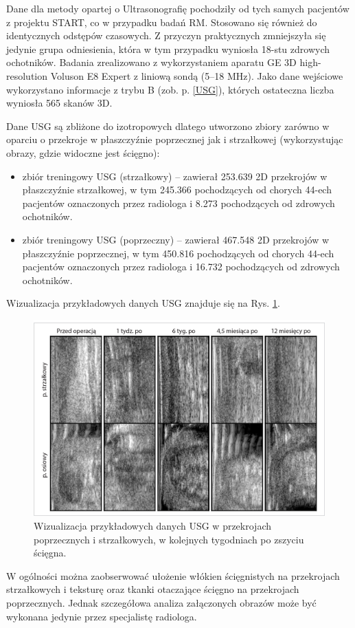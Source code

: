 Dane dla metody opartej o Ultrasonografię pochodziły od tych samych pacjentów z projektu START, co w przypadku badań RM. Stosowano się również do identycznych odstępów czasowych. Z przyczyn praktycznych zmniejszyła się jedynie grupa odniesienia, która w tym przypadku wyniosła 18-stu zdrowych ochotników. Badania zrealizowano z wykorzystaniem aparatu GE 3D high-resolution Voluson E8 Expert z liniową sondą (5--18 MHz). Jako dane wejściowe wykorzystano informacje z trybu B (zob. p. \ref{USG}), których ostateczna liczba wyniosła 565 skanów 3D. 

Dane USG są zbliżone do izotropowych dlatego utworzono zbiory zarówno \linebreak w oparciu o przekroje w płaszczyźnie poprzecznej jak i strzałkowej (wykorzystując obrazy, gdzie widoczne jest ścięgno):
\begin{itemize}[noitemsep,nolistsep]
	\item zbiór treningowy USG (strzałkowy) -- zawierał 253.639 2D przekrojów w płaszczyźnie strzałkowej, w tym 245.366 pochodzących od chorych 44-ech pacjentów oznaczonych przez radiologa i 8.273 pochodzących od zdrowych ochotników.
	\item zbiór treningowy USG (poprzeczny) -- zawierał 467.548 2D przekrojów w płaszczyźnie poprzecznej, w tym 450.816 pochodzących od chorych 44-ech pacjentów oznaczonych przez radiologa i 16.732 pochodzących od zdrowych ochotników. 
\end{itemize}

Wizualizacja przykładowych danych USG znajduje się na Rys. \ref{fig:US_sample}.
\begin{figure}[h!]
	\includegraphics[width=\textwidth]{figures/Data_US_sample.jpg}
	\caption{Wizualizacja przykładowych danych USG w przekrojach poprzecznych i strzałkowych, w kolejnych tygodniach po zszyciu ścięgna.}
	\label{fig:US_sample}
\end{figure}
W ogólności można zaobserwować ułożenie włókien ścięgnistych na przekrojach strzałkowych \linebreak i teksturę oraz tkanki otaczające ścięgno na przekrojach poprzecznych. Jednak szczegółowa analiza załączonych obrazów może być wykonana jedynie przez specjalistę radiologa. 

